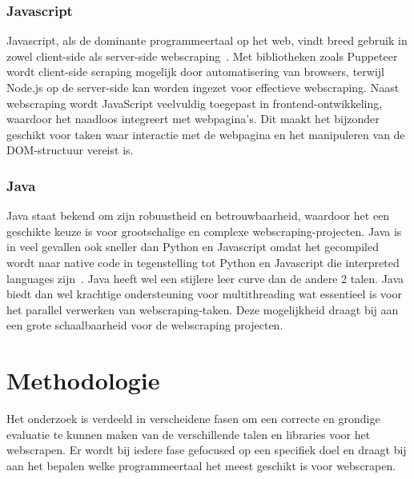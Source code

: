 \subsubsection{Javascript}
Javascript, als de dominante programmeertaal op het web, vindt breed gebruik in zowel client-side als server-side webscraping~\autocite{Raval2023}.
Met bibliotheken zoals Puppeteer wordt client-side scraping mogelijk door automatisering van browsers, terwijl Node.js 
op de server-side kan worden ingezet voor effectieve webscraping. Naast webscraping wordt JavaScript veelvuldig toegepast in 
frontend-ontwikkeling, waardoor het naadloos integreert met webpagina's. Dit maakt het bijzonder geschikt voor taken waar interactie
met de webpagina en het manipuleren van de DOM-structuur vereist is.

\subsubsection{Java}
Java staat bekend om zijn robuustheid en betrouwbaarheid, waardoor het een geschikte keuze is voor grootschalige en 
complexe webscraping-projecten. Java is in veel gevallen ook sneller dan Python en Javascript omdat het gecompiled wordt naar
native code in tegenstelling tot Python en Javascript die interpreted languages zijn~\autocite{Chukwuebuka2023}. Java heeft wel een stijlere leer curve
dan de andere 2 talen. Java biedt dan wel krachtige ondersteuning voor multithreading wat essentieel is voor het parallel
verwerken van webscraping-taken. Deze mogelijkheid draagt bij aan een grote schaalbaarheid voor de webscraping projecten.



\section{Methodologie}%
\label{sec:methodologie}
Het onderzoek is verdeeld in verscheidene fasen om een correcte en grondige evaluatie te kunnen maken van de verschillende talen
en libraries voor het webscrapen. Er wordt bij iedere fase gefocused op een specifiek doel en draagt bij aan het bepalen welke
programmeertaal het meest geschikt is voor webscrapen.

